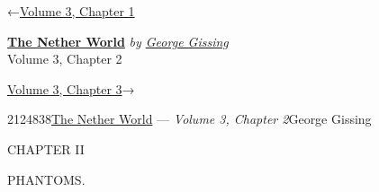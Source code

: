 \hypertarget{headerContainer}{}
\hypertarget{navigationHeader}{}
\protect\hypertarget{headerprevious}{}{←\href{/wiki/The_Nether_World/Volume_3/Chapter_1}{Volume
3, Chapter 1}}

\textbf{\protect\hypertarget{header_title_text}{}{\href{/wiki/The_Nether_World}{The
Nether World}}} \emph{by
\href{/wiki/Author:George_Gissing}{\protect\hypertarget{header_author_text}{}{{George
Gissing}}}}\\
\protect\hypertarget{header_section_text}{}{Volume 3, Chapter 2}

\protect\hypertarget{headernext}{}{\href{/wiki/The_Nether_World/Volume_3/Chapter_3}{Volume
3, Chapter 3}→}

\hypertarget{navigationNotes}{}

\hypertarget{ws-data}{}
\protect\hypertarget{ws-article-id}{}{2124838}\protect\hypertarget{ws-title}{}{\href{/wiki/The_Nether_World}{The
Nether World} --- \emph{Volume 3, Chapter
2}}\protect\hypertarget{ws-author}{}{George Gissing}

{\protect\hypertarget{24}{}{}}

{CHAPTER II}

PHANTOMS.

